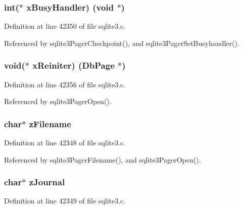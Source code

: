 \subsubsection[{x\+Busy\+Handler}]{\setlength{\rightskip}{0pt plus 5cm}int($\ast$ x\+Busy\+Handler) (void $\ast$)}\label{struct_pager_a3c0ec4b23e5e61ba3ee7ae2021ed6128}


Definition at line 42350 of file sqlite3.\+c.



Referenced by sqlite3\+Pager\+Checkpoint(), and sqlite3\+Pager\+Set\+Busyhandler().

\hypertarget{struct_pager_a1024b74014114a0ccd65cbeb57bf9137}{}
\subsubsection[{x\+Reiniter}]{\setlength{\rightskip}{0pt plus 5cm}void($\ast$ x\+Reiniter) (Db\+Page $\ast$)}\label{struct_pager_a1024b74014114a0ccd65cbeb57bf9137}


Definition at line 42356 of file sqlite3.\+c.



Referenced by sqlite3\+Pager\+Open().

\hypertarget{struct_pager_a47b2dee2615c9bcdc2d8b755dc571e35}{}
\subsubsection[{z\+Filename}]{\setlength{\rightskip}{0pt plus 5cm}char$\ast$ z\+Filename}\label{struct_pager_a47b2dee2615c9bcdc2d8b755dc571e35}


Definition at line 42348 of file sqlite3.\+c.



Referenced by sqlite3\+Pager\+Filename(), and sqlite3\+Pager\+Open().

\hypertarget{struct_pager_ac131f027b6287ec5068c33fd866e5dbd}{}
\subsubsection[{z\+Journal}]{\setlength{\rightskip}{0pt plus 5cm}char$\ast$ z\+Journal}\label{struct_pager_ac131f027b6287ec5068c33fd866e5dbd}


Definition at line 42349 of file sqlite3.\+c.



